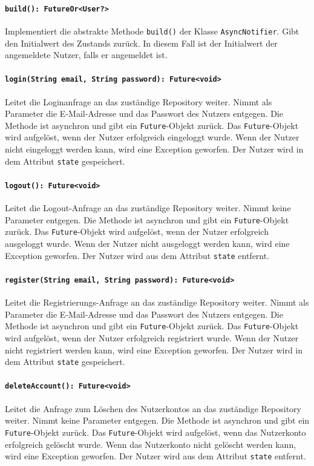 \documentclass{entwurfsheft}
\begin{document}
\paragraph{\texttt{build(): FutureOr<User?>}}
Implementiert die abstrakte Methode \texttt{build()} der Klasse \texttt{Async\-Notifier}. Gibt den Initialwert des Zustands zurück. In diesem Fall ist der Initialwert der angemeldete Nutzer, falls er angemeldet ist.
\paragraph{\texttt{login(String email, String password): Future<void>}}
Leitet die Loginanfrage an das zuständige Repository weiter. Nimmt als Parameter die E-Mail-Adresse und das Passwort des Nutzers entgegen. Die Methode ist asynchron und gibt ein \texttt{Future}-Objekt zurück. Das \texttt{Future}-Objekt wird aufgelöst, wenn der Nutzer erfolgreich eingeloggt wurde. Wenn der Nutzer nicht eingeloggt werden kann, wird eine Exception geworfen. Der Nutzer wird in dem Attribut \texttt{state} gespeichert.
\paragraph{\texttt{logout(): Future<void>}}
Leitet die Logout-Anfrage an das zuständige Repository weiter. Nimmt keine Parameter entgegen. Die Methode ist asynchron und gibt ein \texttt{Future}-Objekt zurück. Das \texttt{Future}-Objekt wird aufgelöst, wenn der Nutzer erfolgreich ausgeloggt wurde. Wenn der Nutzer nicht ausgeloggt werden kann, wird eine Exception geworfen. Der Nutzer wird aus dem Attribut \texttt{state} entfernt.
\paragraph{\texttt{register(String email, String password): Future<void>}}
Leitet die Registrierungs-An\-frage an das zuständige Repository weiter. Nimmt als Parameter die E-Mail-Adresse und das Passwort des Nutzers entgegen. Die Methode ist asynchron und gibt ein \texttt{Future}-Objekt zurück. Das \texttt{Future}-Objekt wird aufgelöst, wenn der Nutzer erfolgreich registriert wurde. Wenn der Nutzer nicht registriert werden kann, wird eine Exception geworfen. Der Nutzer wird in dem Attribut \texttt{state} gespeichert.
\paragraph{\texttt{deleteAccount(): Future<void>}}
Leitet die Anfrage zum Löschen des Nutzerkontos an das zuständige Repository weiter. Nimmt keine Parameter entgegen. Die Methode ist asynchron und gibt ein \texttt{Future}-Objekt zurück. Das \texttt{Future}-Objekt wird aufgelöst, wenn das Nutzerkonto erfolgreich gelöscht wurde. Wenn das Nutzerkonto nicht gelöscht werden kann, wird eine Exception geworfen. Der Nutzer wird aus dem Attribut \texttt{state} entfernt.
\end{document}
